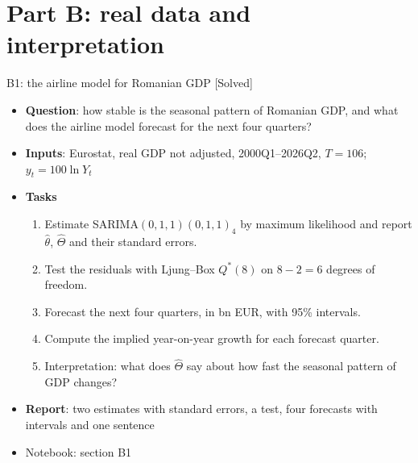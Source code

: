 \section{Part B: real data and interpretation}

\begin{frame}{B1: the airline model for Romanian GDP [Solved]}
\itemsize{\footnotesize}
\begin{itemize}
\item \textbf{Question}: how stable is the seasonal pattern of Romanian GDP, and what does the airline model forecast for the next four quarters?
\item \textbf{Inputs}: Eurostat, real GDP not adjusted, 2000Q1--2026Q2, $T = 106$; $y_t = 100\ln Y_t$
\item \textbf{Tasks}
\begin{enumerate}
    \item Estimate SARIMA$(0,1,1)(0,1,1)_4$ by maximum likelihood and report $\hat\theta$, $\hat\Theta$ and their standard errors.
    \item Test the residuals with Ljung--Box $Q^*(8)$ on $8 - 2 = 6$ degrees of freedom.
    \item Forecast the next four quarters, in bn EUR, with 95\% intervals.
    \item Compute the implied year-on-year growth for each forecast quarter.
    \item Interpretation: what does $\hat\Theta$ say about how fast the seasonal pattern of GDP changes?
\end{enumerate}
\item \textbf{Report}: two estimates with standard errors, a test, four forecasts with intervals and one sentence
\item Notebook: section B1
\end{itemize}
\end{frame}

